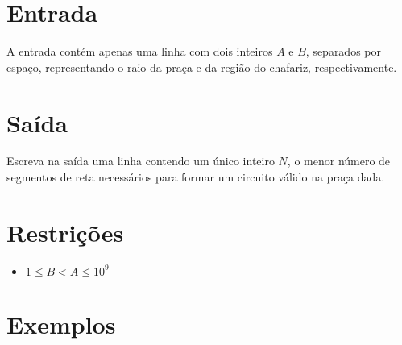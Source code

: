 \section*{Entrada}

A entrada contém apenas uma linha com dois inteiros $A$ e $B$, separados por espaço, representando o raio da praça e da região do chafariz, respectivamente.

\section*{Saída}

Escreva na saída uma linha contendo um único inteiro $N$, o menor número de segmentos de reta necessários para formar um circuito válido na praça
dada.

\section*{Restrições}

\begin{itemize}
\item $1 \leq B < A \leq 10^9$
\end{itemize}

\section*{Exemplos}
\exemplo
